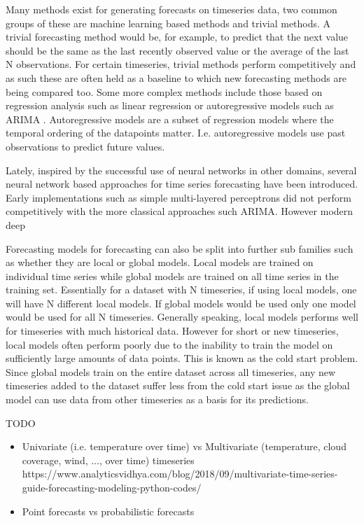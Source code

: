 Many methods exist for generating forecasts on timeseries data, two common groups of these are machine learning based methods and trivial methods. A trivial forecasting method would be, for example, to predict that the next value should be the same as the last recently observed value or the average of the last N observations. For certain timeseries, trivial methods perform competitively and as such these are often held as a baseline to which new forecasting methods are being compared too. Some more complex methods include those based on regression analysis such as linear regression or autoregressive models such as ARIMA \cite{hyndman_forecasting_3rd}. Autoregressive models are a subset of regression models where the temporal ordering of the datapoints matter. I.e. autoregressive models use past observations to predict future values. 

Lately, inspired by the successful use of neural networks in other domains, several neural network based approaches for time series forecasting have been introduced. Early implementations such as simple multi-layered perceptrons did not perform competitively with the more classical approaches such ARIMA. However modern deep

Forecasting models for forecasting can also be split into further sub families such as whether they are local or global models. Local models are trained on individual time series while global models are trained on all time series in the training set. Essentially for a dataset with N timeseries, if using local models, one will have N different local models. If global models would be used only one model would be used for all N timeseries. Generally speaking, local models performs well for timeseries with much historical data. However for short or new timeseries, local models often perform poorly due to the inability to train the model on sufficiently large amounts of data points. This is known as the cold start problem. Since global models train on the entire dataset across all timeseries, any new timeseries added to the dataset suffer less from the cold start issue as the global model can use data from other timeseries as a basis for its predictions. \cite{wang_deep_2019} 



TODO

\begin{itemize}
\item Univariate (i.e. temperature over time) vs Multivariate (temperature, cloud coverage, wind, ..., over time) timeseries https://www.analyticsvidhya.com/blog/2018/09/multivariate-time-series-guide-forecasting-modeling-python-codes/
\item Point forecasts vs probabilistic forecasts
\end{itemize}


